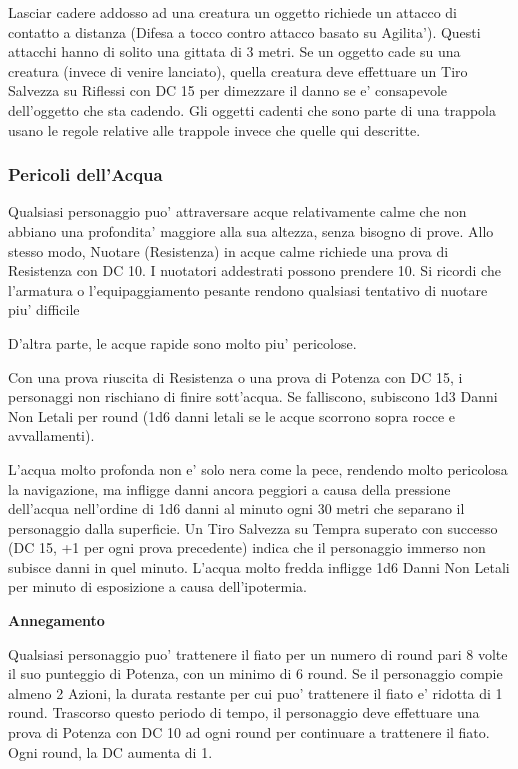 \documentclass[a4paper,11pt,twoside,openany]{dndbook}
\begin{document}
{\bigskip

Lasciar cadere addosso ad una creatura un oggetto richiede un attacco di contatto a distanza (Difesa a tocco contro attacco basato su Agilita'). Questi attacchi hanno di solito una gittata di 3 metri. Se un oggetto cade su una creatura (invece di venire lanciato), quella creatura deve effettuare un Tiro Salvezza su Riflessi con DC 15 per dimezzare il danno se e' consapevole dell'oggetto che sta cadendo. Gli oggetti cadenti che sono parte di una trappola usano le regole relative alle trappole invece che quelle qui descritte.

\subsubsection{Pericoli dell'Acqua}

\label{pericoli-dellacqua}

Qualsiasi personaggio puo' attraversare acque relativamente calme che non abbiano una profondita' maggiore alla sua altezza, senza bisogno di prove. Allo stesso modo, Nuotare (Resistenza) in acque calme richiede una prova di Resistenza con DC 10. I nuotatori addestrati possono prendere 10. Si ricordi che l'armatura o l'equipaggiamento pesante rendono qualsiasi tentativo di nuotare piu' difficile

D'altra parte, le acque rapide sono molto piu' pericolose.

Con una prova riuscita di Resistenza o una prova di Potenza con DC 15, i personaggi non rischiano di finire sott'acqua. Se falliscono, subiscono 1d3 Danni Non Letali per round (1d6 danni letali se le acque scorrono sopra rocce e avvallamenti).

L'acqua molto profonda non e' solo nera come la pece, rendendo molto pericolosa la navigazione, ma infligge danni ancora peggiori a causa della pressione dell'acqua nell'ordine di 1d6 danni al minuto ogni 30 metri che separano il personaggio dalla superficie. Un Tiro Salvezza su Tempra superato con successo (DC 15, +1 per ogni prova precedente) indica che il personaggio immerso non subisce danni in quel minuto. L'acqua molto fredda infligge 1d6 Danni Non Letali per minuto di esposizione a causa dell'ipotermia.

\textbf{Annegamento}

Qualsiasi personaggio puo' trattenere il fiato per un numero di round pari 8 volte il suo punteggio di Potenza, con un minimo di 6 round. Se il personaggio compie almeno 2 Azioni, la durata restante per cui puo' trattenere il fiato e' ridotta di 1 round. Trascorso questo periodo di tempo, il personaggio deve effettuare una prova di Potenza con DC 10 ad ogni round per continuare a trattenere il fiato. Ogni round, la DC aumenta di 1.

}
\end{document}
